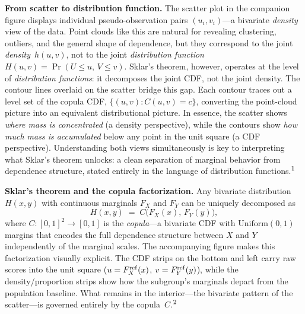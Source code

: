 \documentclass[10pt]{article}
\begin{document}
\noindent
\begin{minipage}[t]{7.8in}
  \vspace{0.1in}
  \hspace{0.2in}%
  \begin{minipage}{7.4in}
    \small\raggedright\color{bodyGrey}

    \textbf{From scatter to distribution function.}\enspace
    The scatter plot in the companion figure displays individual pseudo-observation
    pairs $(u_i, v_i)$---a bivariate \emph{density} view of the data. Point clouds
    like this are natural for revealing clustering, outliers, and the general shape
    of dependence, but they correspond to the joint \emph{density}~$h(u,v)$, not to
    the joint \emph{distribution function}~$H(u,v) = \Pr(U \le u,\, V \le v)$.
    Sklar's theorem, however, operates at the level of \emph{distribution functions}:
    it decomposes the joint CDF, not the joint density. The contour lines overlaid on
    the scatter bridge this gap. Each contour traces out a level set of the copula
    CDF, $\{(u,v) : C(u,v) = c\}$, converting the point-cloud picture into an
    equivalent distributional picture.  In essence, the scatter shows \emph{where mass
    is concentrated} (a density perspective), while the contours show \emph{how much
    mass is accumulated} below any point in the unit square (a CDF perspective).
    Understanding both views simultaneously is key to interpreting what Sklar's
    theorem unlocks: a clean separation of marginal behavior from dependence
    structure, stated entirely in the language of distribution
    functions.$^{\mbox{\footnotesize{1}}}$

    \vspace{6pt}
    \textbf{Sklar's theorem and the copula factorization.}\enspace
    Any bivariate distribution $H(x,y)$ with continuous marginals $F_X$ and $F_Y$
    can be uniquely decomposed as
    \begin{equation}
      H(x,y) \;=\; C\bigl(F_X(x),\, F_Y(y)\bigr),
      \tag{M.4}
    \end{equation}
    where $C\colon [0,1]^2 \to [0,1]$ is the \emph{copula}---a bivariate CDF with
    $\mathrm{Uniform}(0,1)$ margins that encodes the full dependence structure
    between $X$ and $Y$ independently of the marginal scales.
    The accompanying figure makes this factorization visually explicit.
    The CDF strips on the bottom and left carry raw scores into the unit square
    ($u = F_X^{\mathrm{ref}}(x)$, $v = F_Y^{\mathrm{ref}}(y)$), while the density/proportion strips
    show how the subgroup's marginals depart from the population baseline.
    What remains in the interior---the bivariate pattern of the
    scatter---is governed entirely by the copula~$C$.$^{\mbox{\footnotesize{2}}}$


\end{minipage}
\end{minipage}
\end{document}
